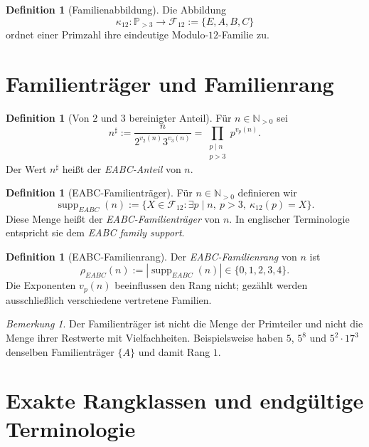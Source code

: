 \documentclass[11pt,a4paper,reqno]{amsart}
\theoremstyle{definition}
\newtheorem{definition}[theorem]{Definition}
\theoremstyle{remark}
\newtheorem{remark}[theorem]{Bemerkung}
\newcommand{\Npos}{\mathbb{N}_{>0}}
\newcommand{\Pset}{\mathbb{P}}
\newcommand{\Fam}{\mathcal{F}_{12}}
\newcommand{\suppE}{\operatorname{supp}_{EABC}}
\newcommand{\rankE}{\rho_{EABC}}
\begin{document}
\begin{definition}[Familienabbildung]
Die Abbildung
\[
\kappa_{12}:\Pset_{>3}\longrightarrow \Fam:=\{E,A,B,C\}
\]
ordnet einer Primzahl ihre eindeutige Modulo-$12$-Familie zu.
\end{definition}

\section{Familienträger und Familienrang}

\begin{definition}[Von $2$ und $3$ bereinigter Anteil]
Für $n\in\Npos$ sei
\[
n^{\sharp}:=\frac{n}{2^{v_2(n)}3^{v_3(n)}}
       =\prod_{\substack{p\mid n\\p>3}}p^{v_p(n)}.
\]
Der Wert $n^{\sharp}$ heißt der \emph{EABC-Anteil} von $n$.
\end{definition}

\begin{definition}[EABC-Familienträger]
Für $n\in\Npos$ definieren wir
\[
\suppE(n)
:=\bigl\{X\in\Fam:\exists p\mid n,\ p>3,\ \kappa_{12}(p)=X\bigr\}.
\]
Diese Menge heißt der \emph{EABC-Familienträger} von $n$. In englischer Terminologie entspricht sie dem \emph{EABC family support}.
\end{definition}

\begin{definition}[EABC-Familienrang]
Der \emph{EABC-Familienrang} von $n$ ist
\[
\rankE(n):=|\suppE(n)|\in\{0,1,2,3,4\}.
\]
Die Exponenten $v_p(n)$ beeinflussen den Rang nicht; gezählt werden ausschließlich verschiedene vertretene Familien.
\end{definition}

\begin{remark}
Der Familienträger ist nicht die Menge der Primteiler und nicht die Menge ihrer Restwerte mit Vielfachheiten. Beispielsweise haben $5$, $5^8$ und $5^2\cdot17^3$ denselben Familienträger $\{A\}$ und damit Rang $1$.
\end{remark}

\section{Exakte Rangklassen und endgültige Terminologie}
\end{document}
